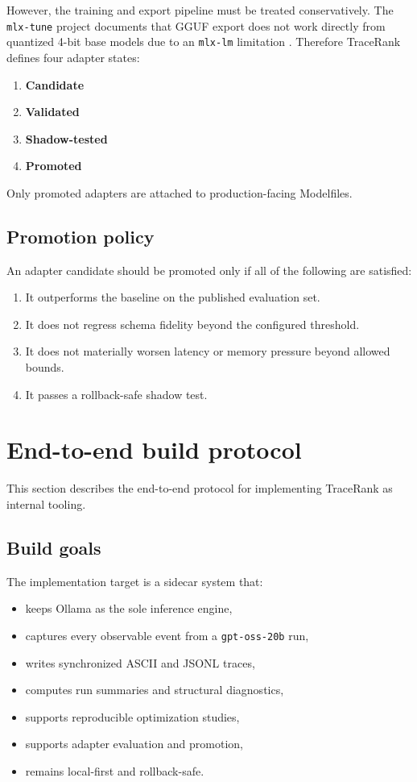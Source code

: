     However, the training and export pipeline must be treated conservatively. The \texttt{mlx-tune} project documents that GGUF export does not work directly from quantized 4-bit base models due to an \texttt{mlx-lm} limitation \cite{mlxtune_readme}. Therefore TraceRank defines four adapter states:
    \begin{enumerate}[label=\arabic*.]
      \item \textbf{Candidate}
      \item \textbf{Validated}
      \item \textbf{Shadow-tested}
      \item \textbf{Promoted}
    \end{enumerate}
    Only promoted adapters are attached to production-facing Modelfiles.
    
    \subsection{Promotion policy}
    An adapter candidate should be promoted only if all of the following are satisfied:
    \begin{enumerate}[label=\alph*.]
      \item It outperforms the baseline on the published evaluation set.
      \item It does not regress schema fidelity beyond the configured threshold.
      \item It does not materially worsen latency or memory pressure beyond allowed bounds.
      \item It passes a rollback-safe shadow test.
    \end{enumerate}
    
    \section{End-to-end build protocol}
    This section describes the end-to-end protocol for implementing TraceRank as internal tooling.
    
    \subsection{Build goals}
    The implementation target is a sidecar system that:
    \begin{itemize}
      \item keeps Ollama as the sole inference engine,
      \item captures every observable event from a \texttt{gpt-oss-20b} run,
      \item writes synchronized ASCII and JSONL traces,
      \item computes run summaries and structural diagnostics,
      \item supports reproducible optimization studies,
      \item supports adapter evaluation and promotion,
      \item remains local-first and rollback-safe.
    \end{itemize}
    
